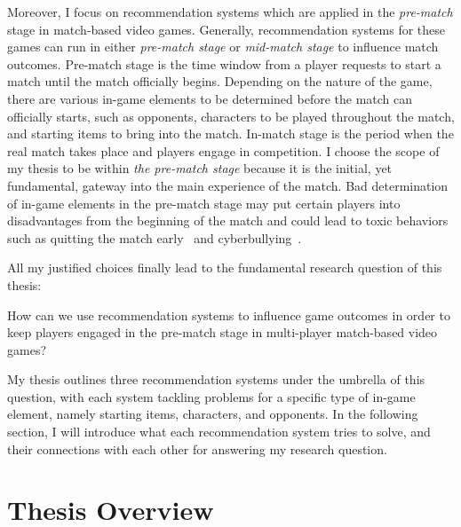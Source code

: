Moreover, I focus on recommendation systems which are applied in the \textit{pre-match} stage in match-based video games. Generally, recommendation systems for these games can run in either \textit{pre-match stage} or \textit{mid-match stage} to influence match outcomes. Pre-match stage is the time window from a player requests to start a match until the match officially begins. Depending on the nature of the game, there are various in-game elements to be determined before the match can officially starts, such as opponents, characters to be played throughout the match, and starting items to bring into the match. In-match stage is the period when the real match takes place and players engage in competition. I choose the scope of my thesis to be within \textit{the pre-match stage} because it is the initial, yet fundamental, gateway into the main experience of the match. Bad determination of in-game elements in the pre-match stage may put certain players into disadvantages from the beginning of the match and could lead to toxic behaviors such as quitting the match early~\cite{shores2014identification} and cyberbullying~\cite{kwak2015exploring}. 

All my justified choices finally lead to the fundamental research question of this thesis:

\begin{displayquote}
How can we use recommendation systems to influence game outcomes in order to keep players engaged in the pre-match stage in multi-player match-based video games?
\end{displayquote}


My thesis outlines three recommendation systems under the umbrella of this question, with each system tackling problems for a specific type of in-game element, namely starting items, characters, and opponents. In the following section, I will introduce what each recommendation system tries to solve, and their connections with each other for answering my research question.

\section{Thesis Overview}

